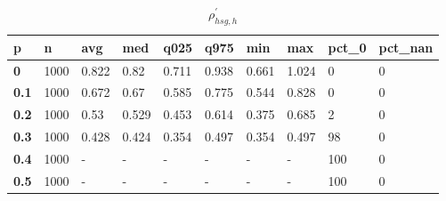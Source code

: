 \begin{table}[h]
 \centering 
\footnotesize
\caption{$\rho_{hsg,h}^\prime $}
\label{tab:alphahsgh}
\begin{tabular}[h]{|l|l|l|l|l|l|l|l|l|l|
    } \hline
\textbf{ p} & \textbf{ n} & \textbf{ avg} & \textbf{ med} & \textbf{ q025} & \textbf{ q975} & \textbf{ min} & \textbf{ max} & \textbf{ pct\_0} & \textbf{ pct\_nan}
    \\ \hline
  \textbf{  0} & 1000 & 0.822 &  0.82 & 0.711 & 0.938 & 0.661 & 1.024 &   0 & 0
    \\ \hline
  \textbf{0.1} & 1000 & 0.672 &  0.67 & 0.585 & 0.775 & 0.544 & 0.828 &   0 & 0
    \\ \hline
  \textbf{0.2} & 1000 &  0.53 & 0.529 & 0.453 & 0.614 & 0.375 & 0.685 &   2 & 0
    \\ \hline
  \textbf{0.3} & 1000 & 0.428 & 0.424 & 0.354 & 0.497 & 0.354 & 0.497 &  98 & 0
    \\ \hline
  \textbf{0.4} & 1000 & - & - & - & - & - & - & 100 & 0
    \\ \hline
  \textbf{0.5} & 1000 & - & - & - & - & - & - & 100 & 0
    \\ \hline
 \end{tabular}
 \end{table}
